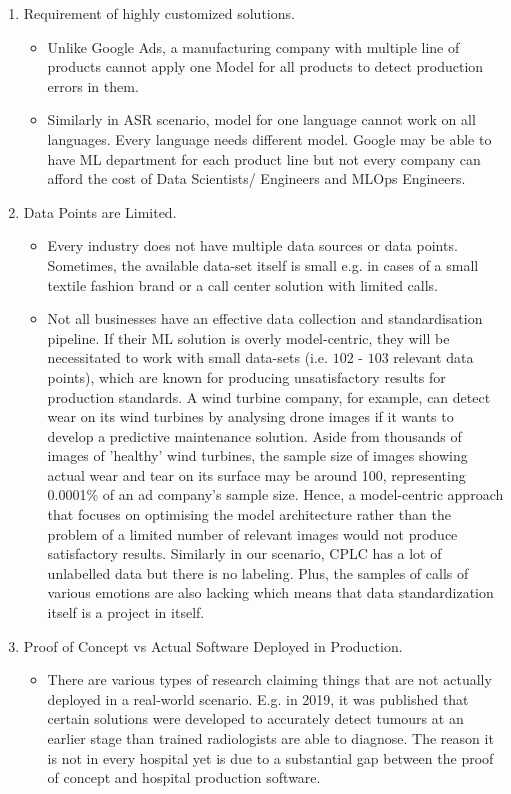 \begin{enumerate}
    \item Requirement of highly customized solutions. 
    \begin{itemize}
        \item Unlike Google Ads, a manufacturing company with multiple line of products cannot apply one Model for all products to detect production errors in them.
        \item  Similarly in ASR scenario, model for one language cannot work on all languages. Every language needs different model. Google may be able to have ML department for each product line but not every company can afford the cost of Data Scientists/ Engineers and MLOps Engineers.
    \end{itemize}
    \item Data Points are Limited. 
    \begin{itemize} 
        \item Every industry does not have multiple data sources or data points. Sometimes, the available data-set itself is small e.g. in cases of a small textile fashion brand or a call center solution with limited calls. 
        \item Not all businesses have an effective data collection and standardisation pipeline. If their ML solution is overly model-centric, they will be necessitated to work with small data-sets (i.e. $102$ - $103$ relevant data points), which are known for producing unsatisfactory results for production standards. A wind turbine company, for example, can detect wear on its wind turbines by analysing drone images if it wants to develop a predictive maintenance solution. Aside from thousands of images of 'healthy' wind turbines, the sample size of images showing actual wear and tear on its surface may be around 100, representing 0.0001\% of an ad company's sample size. Hence, a model-centric approach that focuses on optimising the model architecture rather than the problem of a limited number of relevant images would not produce satisfactory results. Similarly in our scenario, CPLC has a lot of unlabelled data but there is no labeling. Plus, the samples of calls of various emotions are also lacking which means that data standardization itself is a project in itself.
    \end{itemize}
    \item Proof of Concept vs Actual Software Deployed in Production. 
    \begin{itemize}
        \item  There are various types of research claiming things that are not actually deployed in a real-world scenario. E.g. in 2019, it was published\cite{ardila_end--end_2019} that certain solutions were developed to accurately detect tumours at an earlier stage than trained radiologists are able to diagnose.  The reason it is not in every hospital yet is due to a substantial gap between the proof of concept and hospital production software. 

\end{itemize}
\end{enumerate}
